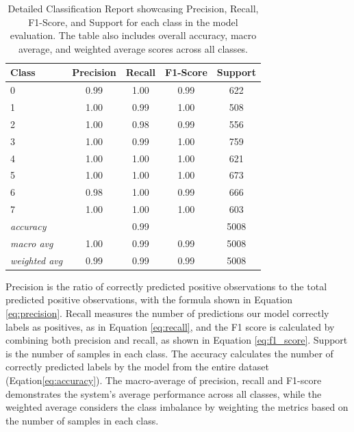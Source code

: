 \begin{table}[h]
	\centering
	\caption{Detailed Classification Report showcasing Precision, Recall, F1-Score, and Support for each class in the model evaluation. The table also includes overall accuracy, macro average, and weighted average scores across all classes.}
	\renewcommand{\arraystretch}{1.35} %
	\begin{tabular}{lcccc}
		\hline
		\textbf{Class} & \textbf{Precision} & \textbf{Recall} & \textbf{F1-Score} & \textbf{Support} \\ \hline
		0 & 0.99 & 1.00 & 0.99 & 622 \\
		1 & 1.00 & 0.99 & 1.00 & 508 \\
		2 & 1.00 & 0.98 & 0.99 & 556 \\
		3 & 1.00 & 0.99 & 1.00 & 759 \\
		4 & 1.00 & 1.00 & 1.00 & 621 \\
		5 & 1.00 & 1.00 & 1.00 & 673 \\
		6 & 0.98 & 1.00 & 0.99 & 666 \\
		7 & 1.00 & 1.00 & 1.00 & 603 \\
		\textit{accuracy}    &                   & 0.99            &                 & 5008             \\
		\textit{macro avg}   & 1.00               & 0.99            & 0.99              & 5008             \\
		\textit{weighted avg} & 0.99               & 0.99            & 0.99              & 5008             \\ \hline
	\end{tabular}
	\label{tab:report}
\end{table}

Precision is the ratio of correctly predicted positive observations to the total predicted positive observations, with the formula shown in Equation \ref{eq:precision}. Recall measures the number of predictions our model correctly labels as positives, as in Equation \ref{eq:recall}, and the F1 score is calculated by combining both precision and recall, as shown in Equation \ref{eq:f1_score}. Support is the number of samples in each class. The accuracy calculates the number of correctly predicted labels by the model from the entire dataset (Eqation\ref{eq:accuracy}). The macro-average of precision, recall and F1-score demonstrates the system's average performance across all classes, while the weighted average considers the class imbalance by weighting the metrics based on the number of samples in each class.

